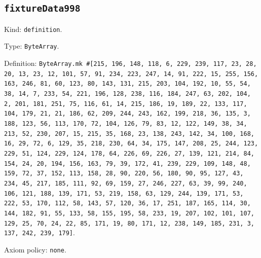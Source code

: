 \documentclass[11pt]{article}
\begin{document}
\subsection*{\texttt{fixtureData998}}
\noindent Kind: \texttt{definition}.\par
\noindent Type: \texttt{ByteArray}.\par
\noindent Definition: \texttt{ByteArray.mk \#[215, 196, 148, 118, 6, 229, 239, 117, 23, 28, 20, 13, 23, 12, 101, 57, 91, 234, 223, 247, 14, 91, 222, 15, 255, 156, 163, 246, 81, 60, 123, 80, 143, 131, 215, 203, 104, 192, 10, 55, 54, 38, 14, 7, 233, 54, 221, 196, 128, 238, 116, 184, 247, 63, 202, 104, 2, 201, 181, 251, 75, 116, 61, 14, 215, 186, 19, 189, 22, 133, 117, 104, 179, 21, 21, 186, 62, 209, 244, 243, 162, 199, 218, 36, 135, 3, 188, 123, 56, 113, 170, 72, 104, 126, 79, 83, 12, 122, 149, 38, 34, 213, 52, 230, 207, 15, 215, 35, 168, 23, 138, 243, 142, 34, 100, 168, 16, 29, 72, 6, 129, 35, 218, 230, 64, 34, 175, 147, 208, 25, 244, 123, 229, 51, 124, 229, 124, 178, 64, 226, 69, 226, 27, 139, 121, 214, 84, 154, 24, 20, 194, 156, 163, 79, 39, 172, 41, 239, 229, 109, 148, 48, 159, 72, 37, 152, 113, 158, 28, 90, 220, 56, 180, 90, 95, 127, 43, 234, 45, 217, 185, 111, 92, 69, 159, 27, 246, 227, 63, 39, 99, 240, 106, 121, 188, 139, 171, 53, 219, 158, 63, 129, 244, 139, 171, 53, 222, 53, 170, 112, 58, 143, 57, 120, 36, 17, 251, 187, 165, 114, 30, 144, 182, 91, 55, 133, 58, 155, 195, 58, 233, 19, 207, 102, 101, 107, 129, 25, 70, 24, 22, 85, 171, 19, 80, 171, 12, 238, 149, 185, 231, 3, 137, 242, 239, 179]}.\par
\noindent Axiom policy: \texttt{none}.\par
\end{document}
